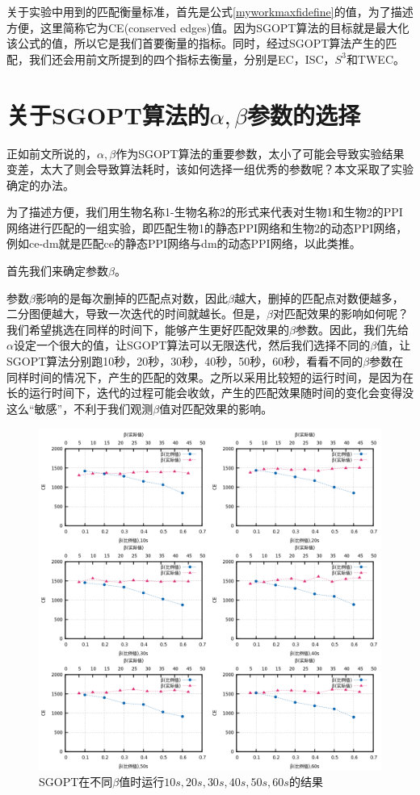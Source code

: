 关于实验中用到的匹配衡量标准，首先是公式\ref{myworkmaxfidefine}的值，为了描述方便，这里简称它为CE(conserved edges)值。因为SGOPT算法的目标就是最大化该公式的值，所以它是我们首要衡量的指标。同时，经过SGOPT算法产生的匹配，我们还会用前文所提到的四个指标去衡量，分别是EC，ISC，$S^3$和TWEC。

\section{关于SGOPT算法的$\alpha,\beta$参数的选择}

正如前文所说的，$\alpha,\beta$作为SGOPT算法的重要参数，太小了可能会导致实验结果变差，太大了则会导致算法耗时，该如何选择一组优秀的参数呢？本文采取了实验确定的办法。

为了描述方便，我们用生物名称1-生物名称2的形式来代表对生物1和生物2的PPI网络进行匹配的一组实验，即匹配生物1的静态PPI网络和生物2的动态PPI网络，例如ce-dm就是匹配ce的静态PPI网络与dm的动态PPI网络，以此类推。

首先我们来确定参数$\beta$。

参数$\beta$影响的是每次删掉的匹配点对数，因此$\beta$越大，删掉的匹配点对数便越多，二分图便越大，导致一次迭代的时间就越长。但是，$\beta$对匹配效果的影响如何呢？我们希望挑选在同样的时间下，能够产生更好匹配效果的$\beta$参数。因此，我们先给$\alpha$设定一个很大的值，让SGOPT算法可以无限迭代，然后我们选择不同的$\beta$值，让SGOPT算法分别跑10秒，20秒，30秒，40秒，50秒，60秒，看看不同的$\beta$参数在同样时间的情况下，产生的匹配的效果。之所以采用比较短的运行时间，是因为在长的运行时间下，迭代的过程可能会收敛，产生的匹配效果随时间的变化会变得没这么“敏感”，不利于我们观测$\beta$值对匹配效果的影响。
\begin{figure}[htbp]
\centering
\includegraphics[width=\textwidth]{pic/beta.png}
\caption{SGOPT在不同$\beta$值时运行$10s,20s,30s,40s,50s,60s$的结果} 
\label{fig:beta}
\end{figure}

